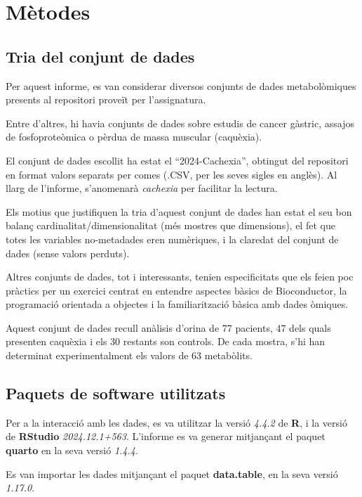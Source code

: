 \documentclass[
  a4paper]{article}
\begin{document}
\section{Mètodes}\label{muxe8todes}

\subsection{Tria del conjunt de dades}\label{tria-del-conjunt-de-dades}

Per aquest informe, es van considerar diversos conjunts de dades
metabolòmiques presents al repositori proveït per l'assignatura.

Entre d'altres, hi havia conjunts de dades sobre estudis de cancer
gàstric, assajos de fosfoproteòmica o pèrdua de massa muscular
(caquèxia).

El conjunt de dades escollit ha estat el ``2024-Cachexia'', obtingut del
repositori en format valors separats per comes (.CSV, per les seves
sigles en anglès). Al llarg de l'informe, s'anomenarà \emph{cachexia}
per facilitar la lectura.

Els motius que justifiquen la tria d'aquest conjunt de dades han estat
el seu bon balanç cardinalitat/dimensionalitat (més mostres que
dimensions), el fet que totes les variables no-metadades eren
numèriques, i la claredat del conjunt de dades (sense valors perduts).

Altres conjunts de dades, tot i interessants, tenien especificitats que
els feien poc pràctics per un exercici centrat en entendre aspectes
bàsics de Bioconductor, la programació orientada a objectes i la
familiarització bàsica amb dades òmiques.

Aquest conjunt de dades recull anàlisis d'orina de 77 pacients, 47 dels
quals presenten caquèxia i els 30 restants son controls. De cada mostra,
s'hi han determinat experimentalment els valors de 63 metabòlits.

\subsection{Paquets de software
utilitzats}\label{paquets-de-software-utilitzats}

Per a la interacció amb les dades, es va utilitzar la versió
\emph{4.4.2} de \textbf{R}, i la versió de \textbf{RStudio}
\emph{2024.12.1+563}. L'informe es va generar mitjançant el paquet
\textbf{quarto} en la seva versió \emph{1.4.4}.

Es van importar les dades mitjançant el paquet \textbf{data.table}, en
la seva versió \emph{1.17.0}.
\end{document}
